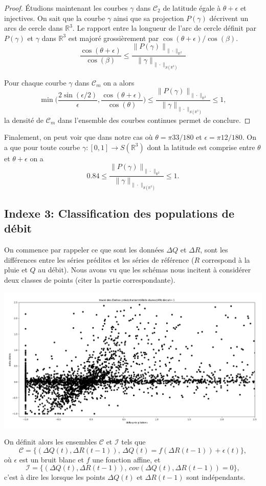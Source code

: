 \documentclass[a4paper,10pt]{article}
\begin{document}
\begin{proof}
Étudions maintenant les courbes $\gamma$ dans $\mathcal{C}_2$ de latitude égale à $\theta+\epsilon$ et injectives. On sait que la courbe $\gamma$ ainsi que sa projection $P(\gamma)$ décrivent un arcs de cercle dans $\mathbb{R}^3$. Le rapport entre la longueur de l'arc de cercle définit par $P(\gamma)$ et $\gamma$ dans $\mathbb{R}^3$ est majoré grossièrement par $\cos(\theta+\epsilon)/\cos(\beta)$.
\[\frac{\cos(\theta+\epsilon)}{\cos(\beta)}\leq\frac{\|P(\gamma)\|_{\|\cdot\|_{\mathbb{R}^2}}}{\|\gamma\|_{\|\cdot\|_{S(\mathbb{R}^3)}}}\]

Pour chaque courbe $\gamma$ dans $\mathcal{C}_m$ on a alors 
\[\min\Big(\frac{2\sin(\epsilon/2)}{\epsilon},\frac{\cos(\theta+\epsilon)}{\cos(\theta)} \Big)\leq \frac{\|P(\gamma)\|_{\|\cdot\|_{\mathbb{R}^2}}}{\|\gamma\|_{\|\cdot\|_{S(\mathbb{R}^3)}}} \leq 1,\]
la densité de $\mathcal{C}_m$ dans l'ensemble des courbes continues permet de conclure.
\end{proof}

Finalement, on peut voir que dans notre cas où $\theta=\pi 33/180$ et $\epsilon=\pi 12/180$. On a que pour toute courbe $\gamma:[0,1]\to S(\mathbb{R}^3)$ dont la latitude est comprise entre $\theta$ et $\theta+\epsilon$ on a
\[0.84\leq \frac{\|P(\gamma)\|_{\|\cdot\|_{\mathbb{R}^2}}}{\|\gamma\|_{\|\cdot\|_{S(\mathbb{R}^3)}}} \leq 1.\]

\subsection{Indexe 3: Classification des populations de débit}
On commence par rappeler ce que sont les données $\Delta Q$ et $\Delta R$, sont les différences entre les séries prédites et les séries de référence ($R$ correspond à la pluie et $Q$ au débit). Nous avons vu  que les schémas nous incitent à considérer deux classes de points (citer la partie correspondante).

\begin{center}
	\includegraphics[scale=0.28]{images/deb_prec_dec1.png}
\end{center}
On définit alors les ensembles $\mathcal{C}$ et $\mathcal{I}$ tels que
\[\mathcal{C}=\{(\Delta Q(t),\Delta R(t-1)), \, \Delta Q(t)= f(\Delta R(t-1))+\epsilon(t)\},\]
où $\epsilon$ est un bruit blanc et $f$ une fonction affine, et
\[\mathcal{I}= \{(\Delta Q(t),\Delta R(t-1)), \, cov(\Delta Q(t),\Delta R(t-1))=0\},\]
c'est à dire les lorsque les points $\Delta Q(t)$ et $\Delta R(t-1)$ sont indépendants.  
\end{document}
